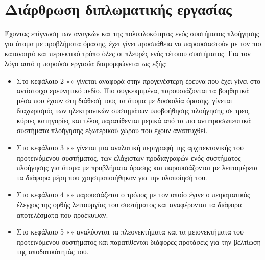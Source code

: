 \section{Διάρθρωση διπλωματικής εργασίας}
Έχοντας επίγνωση των αναγκών και της πολυπλοκότητας ενός συστήματος πλοήγησης για άτομα με προβλήματα όρασης, έχει γίνει προσπάθεια να παρουσιαστούν με τον πιο κατανοητό και περιεκτικό τρόπο όλες οι πλευρές ενός τέτοιου συστήματος. Για τον λόγο αυτό η παρούσα εργασία διαμορφώνεται ως εξής:
\begin{itemize}
    \item Στο κεφάλαιο 2 «» γίνεται αναφορά στην προγενέστερη έρευνα που έχει γίνει στο αντίστοιχο ερευνητικό πεδίο. Πιο συγκεκριμένα, παρουσιάζονται τα βοηθητικά μέσα που έχουν στη διάθεσή τους τα άτομα με δυσκολία όρασης, γίνεται διαχωρισμός των ηλεκτρονικών συστημάτων υποβοήθησης πλοήγησης σε τρεις κύριες κατηγορίες και τέλος παρατίθενται μερικά από τα πιο αντιπροσωπευτικά συστήματα πλοήγησης εξωτερικού χώρου που έχουν αναπτυχθεί.
    \item Στο κεφάλαιο 3 «» γίνεται μια αναλυτική περιγραφή της αρχιτεκτονικής του προτεινόμενου συστήματος, των ελάχιστων προδιαγραφών ενός συστήματος πλοήγησης για άτομα με προβλήματα όρασης και παρουσιάζονται με λεπτομέρεια τα διάφορα μέρη που χρησιμοποιήθηκαν για την υλοποίησή του. 
    \item Στο κεφάλαιο 4 «» παρουσιάζεται ο τρόπος με τον οποίο έγινε ο πειραματικός έλεγχος της ορθής λειτουργίας του συστήματος και αναφέρονται τα διάφορα αποτελέσματα που προέκυψαν.
    \item Στο κεφάλαιο 5 «» αναλύονται τα πλεονεκτήματα και τα μειονεκτήματα του προτεινόμενου συστήματος και παρατίθενται διάφορες προτάσεις για την βελτίωση της αποδοτικότητάς του.
\end{itemize}